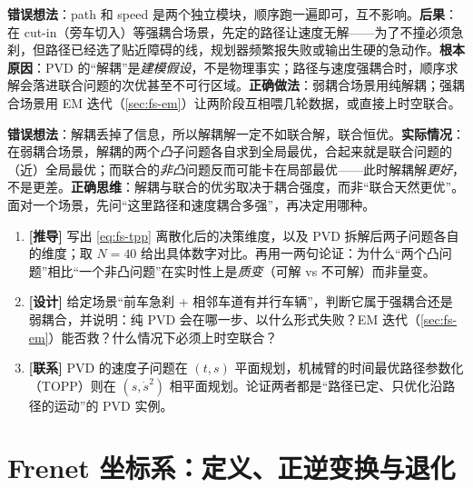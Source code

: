 \begin{pitfall}
\textbf{错误想法}：path 和 speed 是两个独立模块，顺序跑一遍即可，互不影响。\textbf{后果}：在 cut-in（旁车切入）等强耦合场景，先定的路径让速度无解——为了不撞必须急刹，但路径已经选了贴近障碍的线，规划器频繁报失败或输出生硬的急动作。\textbf{根本原因}：PVD 的“解耦”是\emph{建模假设}，不是物理事实；路径与速度强耦合时，顺序求解会落进联合问题的次优甚至不可行区域。\textbf{正确做法}：弱耦合场景用纯解耦；强耦合场景用 EM 迭代（\cref{sec:fs-em}）让两阶段互相喂几轮数据，或直接上时空联合。
\end{pitfall}

\begin{pitfall}[思维陷阱：认为“维度降低 = 近似 = 结果一定更差”]
\textbf{错误想法}：解耦丢掉了信息，所以解耦解一定不如联合解，联合恒优。\textbf{实际情况}：在弱耦合场景，解耦的两个\emph{凸}子问题各自求到全局最优，合起来就是联合问题的（近）全局最优；而联合的\emph{非凸}问题反而可能卡在局部最优——此时解耦解\emph{更好}，不是更差。\textbf{正确思维}：解耦与联合的优劣取决于耦合强度，而非“联合天然更优”。面对一个场景，先问“这里路径和速度耦合多强”，再决定用哪种。
\end{pitfall}

\begin{practice}
\begin{enumerate}
  \item \textbf{[推导]} 写出 \cref{eq:fs-tpp} 离散化后的决策维度，以及 PVD 拆解后两子问题各自的维度；取 $N=40$ 给出具体数字对比。再用一两句论证：为什么“两个凸问题”相比“一个非凸问题”在实时性上是\emph{质变}（可解 vs 不可解）而非量变。
  \item \textbf{[设计]} 给定场景“前车急刹 + 相邻车道有并行车辆”，判断它属于强耦合还是弱耦合，并说明：纯 PVD 会在哪一步、以什么形式失败？EM 迭代（\cref{sec:fs-em}）能否救？什么情况下必须上时空联合？
  \item \textbf{[联系]} PVD 的速度子问题在 $(t,s)$ 平面规划，机械臂的时间最优路径参数化（TOPP）则在 $(s,\dot s^2)$ 相平面规划。论证两者都是“路径已定、只优化沿路径的运动”的 PVD 实例。
\end{enumerate}
\end{practice}

\section{Frenet 坐标系：定义、正逆变换与退化}
\label{sec:fs-frenet}

